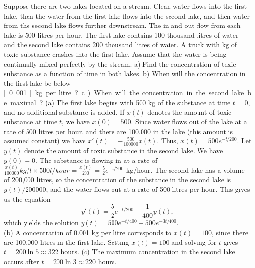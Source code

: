 {Suppose there are two lakes located on a stream.  Clean
water flows into the first lake,
then the water from the first lake flows into the second lake, and then
water from the second lake flows further downstream.
The in and out flow from each lake is 500 litres per hour.
The first lake contains 100 thousand litres of water and the
second lake contains 200 thousand litres of water.
A truck with \unit[500]{kg} of toxic substance
crashes into the first lake.  Assume that the water is being continually
mixed perfectly by the stream.  a) Find the concentration of toxic substance
as a function of time in both lakes.  b) When will the
concentration in the first lake be below \unit[0.001]{kg} per litre?
c) When will the
concentration in the second lake be maximal?}
{(a) The first lake begins with 500 kg of the substance at time $t=0$, and no additional substance is added. If $x(t)$ denotes the amount of toxic substance at time $t$, we have $x(0)=500$. Since water flows out of the lake at a rate of 500 litres per hour, and there are 100,000 in the lake (this amount is assumed constant) we have $x'(t) = -\frac{500}{100000}x(t)$. Thus, $x(t) = 500e^{-t/200}$. Let $y(t)$ denote the amount of toxic substance in the second lake. We have $y(0)=0$. The substance is flowing in at a rate of $\frac{x(t)}{100000} kg/l\times 500 l/hour = \frac{x(t)}{200} = \frac{5}{2}e^{-t/200}$ kg/hour. The second lake has a volume of 200,000 litres, so the concentration of the substance in the second lake is $y(t)/200000$, and the water flows out at a rate of 500 litres per hour. This gives us the equation
\[
y'(t) = \frac{5}{2}e^{-t/200}-\frac{1}{400}y(t),
\]
which yields the solution $y(t) = 500e^{-t/400}-500e^{-3t/400}$.\\
(b) A concentration of 0.001 kg per litre corresponds to $x(t) = 100$, since there are 100,000 litres in the first lake. Setting $x(t)=100$ and solving for $t$ gives $t=200\ln 5 \approx 322$ hours.
(c) The maximum concentration in the second lake occurs after $t=200\ln 3 \approx 220$ hours.}